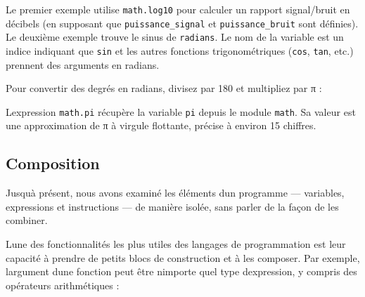 Le premier exemple utilise \texttt{math.log10} pour calculer un rapport
signal/bruit en décibels (en supposant que \texttt{puissance\_signal} et
\texttt{puissance\_bruit} sont définies). Le deuxième exemple trouve le
sinus de \texttt{radians}. Le nom de la variable est un indice indiquant
que \texttt{sin} et les autres fonctions trigonométriques (\texttt{cos},
\texttt{tan}, etc.) prennent des arguments en radians.

Pour convertir des degrés en radians, divisez par 180 et multipliez par
π :

\begin{Shaded}
\begin{Highlighting}[]
\OperatorTok{\textgreater{}\textgreater{}\textgreater{}}\OperatorTok{=} 
\OperatorTok{\textgreater{}\textgreater{}\textgreater{}}\OperatorTok{=}\OperatorTok{/}  \OperatorTok{*}
\OperatorTok{\textgreater{}\textgreater{}\textgreater{}}
\end{Highlighting}
\end{Shaded}

L\textquotesingle expression \texttt{math.pi} récupère la variable
\texttt{pi} depuis le module \texttt{math}. Sa valeur est une
approximation de π à virgule flottante, précise à environ 15 chiffres.

\hypertarget{composition}{%
\subsection{Composition}\label{composition}}

Jusqu\textquotesingle à présent, nous avons examiné les éléments
d\textquotesingle un programme --- variables, expressions et
instructions --- de manière isolée, sans parler de la façon de les
combiner.

L\textquotesingle une des fonctionnalités les plus utiles des langages
de programmation est leur capacité à prendre de petits blocs de
construction et à les composer. Par exemple, l\textquotesingle argument
d\textquotesingle une fonction peut être n\textquotesingle importe quel
type d\textquotesingle expression, y compris des opérateurs
arithmétiques :

\begin{Shaded}
\begin{Highlighting}[]
\OperatorTok{=}\OperatorTok{/}  \OperatorTok{*}  \OperatorTok{*}
\end{Highlighting}
\end{Shaded}

